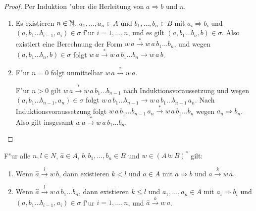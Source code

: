 \documentclass[12pt,a4paper]{article}
\begin{document}
\begin{proof}
  Per Induktion "uber die Herleitung von $a \Rightarrow b$ und $n$.
  \begin{enumerate}
  \item Es existieren $n \in \mathbb N$, $a_1,\ldots,a_n \in A$ und $b_1,\ldots,b_n \in B$ mit
    $a_i \Rightarrow b_i$ und $(a,b_1 \ldots b_{i-1},a_i) \in \sigma$ f"ur $i = 1,\ldots,n$,
    und es gilt $(a,b_1 \ldots b_n,b) \in \sigma$. Also existiert eine Berechnung der Form
    $w\,a \stackrel{*}{\to} w\,a\,b_1 \ldots b_n$, und wegen $(a,b_1 \ldots b_n,b) \in \sigma$
    folgt $w\,a \stackrel{*}{\to} w\,a\,b_1 \ldots b_n \to w\,a\,b$.

  \item F"ur $n = 0$ folgt unmittelbar $w\,a \stackrel{*}{\to} w\,a$.

    F"ur $n > 0$ gilt $w\,a \stackrel{*}{\to} w\,a\,b_1 \ldots b_{n-1}$ nach Induktionsvoraussetzung und wegen
    $(a,b_1 \ldots b_{n-1},a_n)\in\sigma$ folgt $w\,a\,b_1 \ldots b_{n-1} \to w\,a\,b_1 \ldots b_{n-1}\,a_n$.
    Nach Induktionsvoraussetzung folgt
    $w\,a\,b_1 \ldots b_{n-1}\,a_n \stackrel{*}{\to} w\,a\,b_1 \ldots b_n$ wegen $a_n \Rightarrow b_n$.
    Also gilt insgesamt $w\,a \stackrel{*}{\to} w\,a\,b_1 \ldots b_n$.
  \end{enumerate}
\end{proof}

\begin{theorem}[Korrektheit]
  F"ur alle $n,l \in N$, $\hat{a} \in A$, $b, b_1,\ldots,b_n \in B$ und
  $w \in (A \uplus B)^*$ gilt:
  \begin{enumerate}
  \item Wenn $\hat{a} \stackrel{l}{\to} w\,b$, dann existieren $k < l$ und $a \in A$ mit
    $a \Rightarrow b$ und $\hat{a} \stackrel{k}{\to} w\,a$.
  \item Wenn $\hat{a} \stackrel{l}{\to} w\,a\,b_1 \ldots b_n$, dann existieren $k \le l$
    und $a_1,\ldots,a_n \in A$ mit
    $a_i \Rightarrow b_i$ und $(a,b_1 \ldots b_{i-1},a_i) \in \sigma$ f"ur $i=1,\ldots,n$, und
    $\hat{a} \stackrel{k}{\to} w\,a$.
  \end{enumerate}
\end{theorem}
\end{document}
